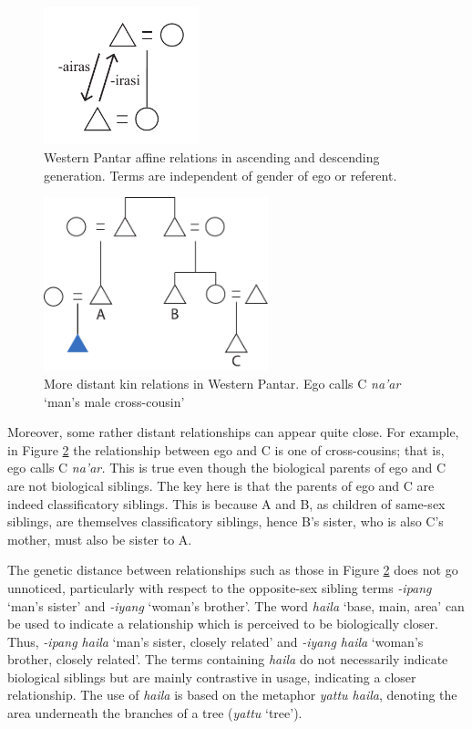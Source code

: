 \begin{figure}[t]
\centering
\includegraphics[width=4.5cm]{figures/Holton_ch5_fig3.pdf}
\caption{ Western Pantar affine relations in ascending and descending generation. Terms are independent of gender of ego or referent.}
\label{fig:5:3}
\end{figure}  


\begin{figure}
\centering
\includegraphics[width=6.5cm]{figures/Holton_ch5_fig4.pdf}
\caption{More distant kin relations in Western Pantar. Ego calls C \textit{na'ar} `man's male cross-cousin'}
\label{fig:5:4}
\end{figure}   

Moreover, some rather distant relationships can appear quite close. For example, in Figure \ref{fig:5:4} the relationship between ego and C is one of cross-cousins; that is, ego calls C \textit{na'ar.} This is true even though the biological parents of ego and C are not biological siblings. The key here is that the parents of ego and C are indeed classificatory siblings. This is because A and B, as children of same-sex siblings, are themselves classificatory siblings, hence B's sister, who is also C's mother, must also be sister to A. 


The genetic distance between relationships such as those in Figure \ref{fig:5:4} does not go unnoticed, particularly with respect to the opposite-sex sibling terms \textit{-ipang} `man's sister' and \textit{-iyang} `woman's brother'. The word \textit{haila} `base, main, area' can be used to indicate a relationship which is perceived to be biologically closer. Thus, \textit{-ipang haila} `man's sister, closely related' and \textit{-iyang haila} `woman's brother, closely related'. The terms containing \textit{haila} do not necessarily indicate biological siblings but are mainly contrastive in usage, indicating a closer relationship. The use of \textit{haila} is based on the metaphor \textit{yattu haila}, denoting the area underneath the branches of a tree (\textit{yattu} `tree').

